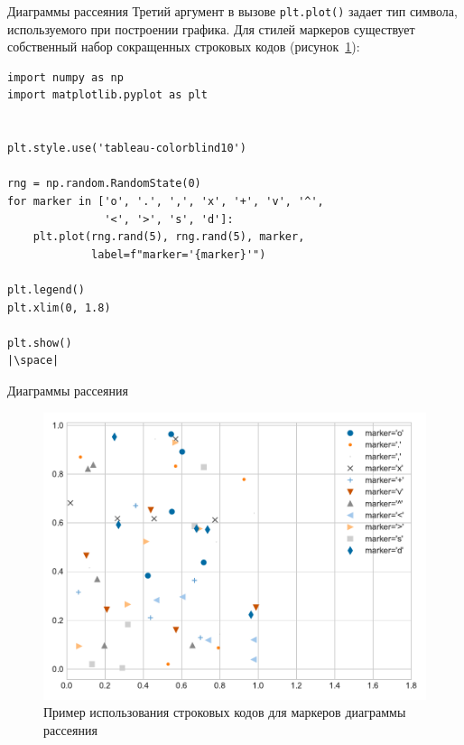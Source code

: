 \documentclass[aspectratio=169, mathserif]{beamer}	%
\begin{document}
\begin{frame}[fragile, label=m]{Диаграммы рассеяния}
\scriptsize
Третий аргумент в вызове \texttt{plt.plot()} задает тип символа, используемого при построении графика. Для стилей маркеров существует собственный набор сокращенных строковых кодов (рисунок~\ref{fig:fig_14}):
\vfill
\begin{verbatim}
import numpy as np
import matplotlib.pyplot as plt


plt.style.use('tableau-colorblind10')

rng = np.random.RandomState(0)
for marker in ['o', '.', ',', 'x', '+', 'v', '^',
               '<', '>', 's', 'd']:
    plt.plot(rng.rand(5), rng.rand(5), marker,
             label=f"marker='{marker}'")

plt.legend()
plt.xlim(0, 1.8)

plt.show()
|\space|
\end{verbatim}
\vfill
\end{frame}

\begin{frame}[fragile, label=m]{Диаграммы рассеяния}
\scriptsize
\begin{figure}[h!]
	\centering
	\includegraphics[width=.65\linewidth]{./pics/Figure_14}
	\caption{Пример использования строковых кодов для маркеров диаграммы рассеяния}
	\label{fig:fig_14}
\end{figure}
\vfill
\end{frame}
\end{document}
